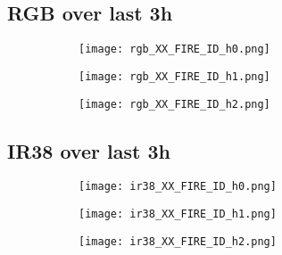 \vspace{-1em}
\subsection*{RGB over last 3h}
\vspace{-1em}
\begin{figure}[H]
    \centering
    \begin{subfigure}[b]{0.32\textwidth}
        \centering
        \texttt{[image: rgb\_XX\_FIRE\_ID\_h0.png]} %
    \end{subfigure}
    \begin{subfigure}[b]{0.32\textwidth}
        \centering
        \texttt{[image: rgb\_XX\_FIRE\_ID\_h1.png]} %
    \end{subfigure}
    \begin{subfigure}[b]{0.32\textwidth}
        \centering
        \texttt{[image: rgb\_XX\_FIRE\_ID\_h2.png]} %
    \end{subfigure}
\end{figure}

\vspace{-1em}
\subsection*{IR38 over last 3h}
\vspace{-1em}
\begin{figure}[H]
    \centering
    \begin{subfigure}[b]{0.32\textwidth}
        \centering
        \texttt{[image: ir38\_XX\_FIRE\_ID\_h0.png]} %
    \end{subfigure}
    \begin{subfigure}[b]{0.32\textwidth}
        \centering
        \texttt{[image: ir38\_XX\_FIRE\_ID\_h1.png]} %
    \end{subfigure}
    \begin{subfigure}[b]{0.32\textwidth}
        \centering
        \texttt{[image: ir38\_XX\_FIRE\_ID\_h2.png]} %
    \end{subfigure}
\end{figure}

